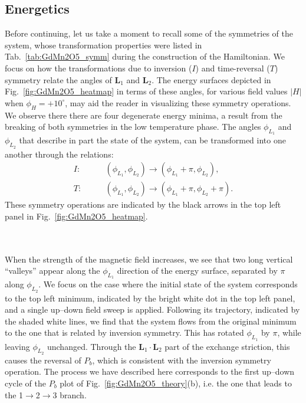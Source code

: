 \subsection{Energetics}
Before continuing, let us take a moment to recall some of the symmetries of the system, whose transformation properties were listed in Tab.~\ref{tab:GdMn2O5_symm} during the construction of the Hamiltonian.
We focus on how the transformations due to inversion ($I$) and time-reversal ($T$) symmetry relate the angles of $\bm L_1$ and $\bm L_2$.
The energy surfaces depicted in Fig.~\ref{fig:GdMn2O5_heatmap} in terms of these angles, for various field values $|H|$ when $\phi_H = +10^\circ$, may aid the reader in visualizing these symmetry operations.
We observe there there are four degenerate energy minima, a result from the breaking of both symmetries in the low temperature phase.
The angles $\phi_{L_1}$ and $\phi_{L_2}$ that describe in part the state of the system, can be transformed into one another through the relations:
\begin{align}
	I:\qquad &(\phi_{L_1}, \phi_{L_2}) \rightarrow (\phi_{L_1}+\pi, \phi_{L_2}),\\
	T:\qquad &(\phi_{L_1}, \phi_{L_2})\rightarrow(\phi_{L_1}+\pi, \phi_{L_2}+\pi).
\end{align}
These symmetry operations are indicated by the black arrows in the top left panel in Fig.~\ref{fig:GdMn2O5_heatmap}.
\begin{figure*}[h!]
	\centering
	\caption{{\bf Energy surfaces in terms of $(\phi_{L_1}, \phi_{L_2})$ for $\phi_H =+10^\circ$.} The shaded dots denote the four degenerate minima. The full white dot corresponds to the example situation discussed in the main text. An indication of its trajectory during a double up--down field sweep is given by the shaded lines. The two black arrows denote the time-reversal (T) and inversion (I) operations.\label{fig:GdMn2O5_heatmap}}
\end{figure*}
\\\\
When the strength of the magnetic field increases, we see that two long vertical ``valleys'' appear along the $\phi_{L_1}$ direction of the energy surface, separated by $\pi$ along $\phi_{L_2}$.
We focus on the case where the initial state of the system corresponds to the top left minimum, indicated by the bright white dot in the top left panel, and a single up--down field sweep is applied.
Following its trajectory, indicated by the shaded white lines, we find that the system flows from the original minimum to the one that is related by inversion symmetry.
This has rotated $\phi_{L_1}$ by $\pi$, while leaving $\phi_{L_2}$ unchanged.
Through the $\bm L_1 \cdot \bm L_2$ part of the exchange striction, this causes the reversal of $P_b$, which is consistent with the inversion symmetry operation.
The process we have described here corresponds to the first up--down cycle of the $P_b$ plot of Fig.~\ref{fig:GdMn2O5_theory}(b), i.e. the one that leads to the 1$\rightarrow$2$\rightarrow$3 branch.

